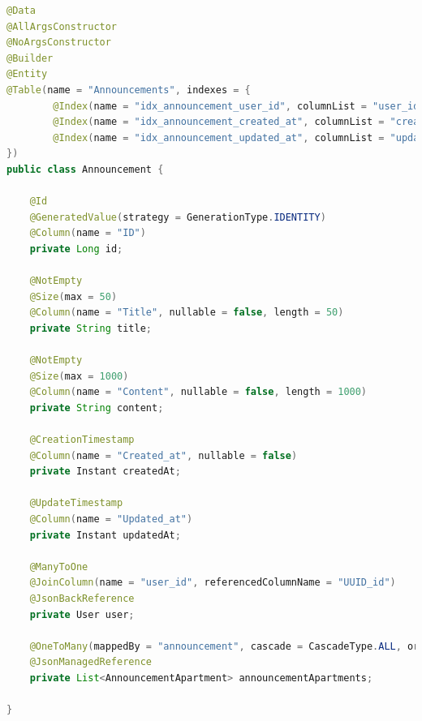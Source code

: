 \begin{lstlisting}[language=Java, style=JavaStyle, caption=Encja \texttt{Announcement}]
@Data
@AllArgsConstructor
@NoArgsConstructor
@Builder
@Entity
@Table(name = "Announcements", indexes = {
        @Index(name = "idx_announcement_user_id", columnList = "user_id"),
        @Index(name = "idx_announcement_created_at", columnList = "created_at"),
        @Index(name = "idx_announcement_updated_at", columnList = "updated_at")
})
public class Announcement {

    @Id
    @GeneratedValue(strategy = GenerationType.IDENTITY)
    @Column(name = "ID")
    private Long id;

    @NotEmpty
    @Size(max = 50)
    @Column(name = "Title", nullable = false, length = 50)
    private String title;

    @NotEmpty
    @Size(max = 1000)
    @Column(name = "Content", nullable = false, length = 1000)
    private String content;

    @CreationTimestamp
    @Column(name = "Created_at", nullable = false)
    private Instant createdAt;

    @UpdateTimestamp
    @Column(name = "Updated_at")
    private Instant updatedAt;

    @ManyToOne
    @JoinColumn(name = "user_id", referencedColumnName = "UUID_id")
    @JsonBackReference
    private User user;

    @OneToMany(mappedBy = "announcement", cascade = CascadeType.ALL, orphanRemoval = true, fetch = FetchType.LAZY)
    @JsonManagedReference
    private List<AnnouncementApartment> announcementApartments;

}
\end{lstlisting}

